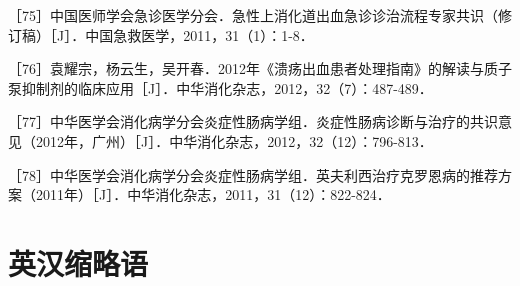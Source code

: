 ［75］中国医师学会急诊医学分会．急性上消化道出血急诊诊治流程专家共识（修订稿）［J］．中国急救医学，2011，31（1）：1-8．

［76］袁耀宗，杨云生，吴开春．2012年《溃疡出血患者处理指南》的解读与质子泵抑制剂的临床应用［J］．中华消化杂志，2012，32（7）：487-489．

［77］中华医学会消化病学分会炎症性肠病学组．炎症性肠病诊断与治疗的共识意见（2012年，广州）［J］．中华消化杂志，2012，32（12）：796-813．

［78］中华医学会消化病学分会炎症性肠病学组．英夫利西治疗克罗恩病的推荐方案（2011年）［J］．中华消化杂志，2011，31（12）：822-824．

\protect\hypertarget{text00032.html}{}{}

\chapter{英汉缩略语}

